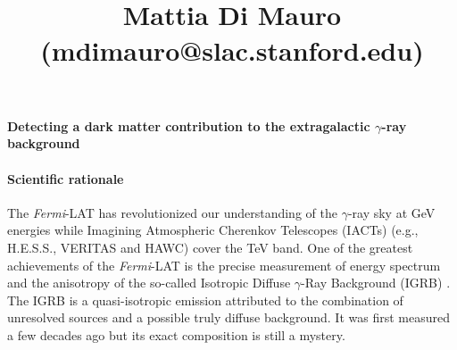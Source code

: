 \documentclass[12 pt]{article}
\title{\vspace{-2.0cm}{\Large Probing dark matter and cosmic evolution of extragalactic sources with the {\it Fermi} isotropic diffuse $\gamma$-ray background}  \\
{\large \bf{Mattia Di Mauro} (mdimauro@slac.stanford.edu)}}
\date{}
\newcommand{\FIXME}[1]{{\color{red}{\em Comment: }{#1}}}
\begin{document}

\vspace{-1.0cm}
\paragraph{Detecting a dark matter contribution to the extragalactic $\gamma$-ray background}

\vspace{-2.0cm}
\paragraph{Scientific rationale}

The {\it Fermi}-LAT has revolutionized our understanding of the $\gamma$-ray sky at GeV energies while Imagining Atmospheric Cherenkov Telescopes (IACTs) (e.g., H.E.S.S., VERITAS and HAWC) cover the TeV band.
One of the greatest achievements of the {\it Fermi}-LAT is the precise measurement of energy spectrum and the anisotropy of the so-called Isotropic Diffuse $\gamma$-Ray Background (IGRB) \cite{Ackermann:2014usa,2012PhRvD..85h3007A}. 
The IGRB is a quasi-isotropic emission attributed to the combination of unresolved sources and a possible
truly diffuse background. It was first measured a few decades ago but its exact composition is still a mystery.
\end{document}
